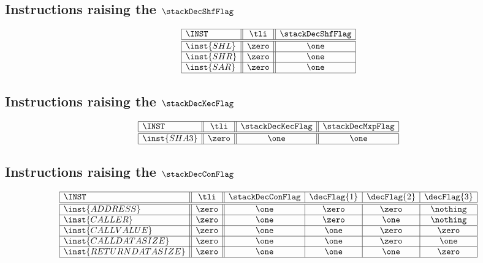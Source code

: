 \subsection{Instructions raising the $\stackDecShfFlag$}
\label{hub: instruction handling: Shf}

\[
\begin{array}{|l||c||c|}
	\hline
	\INST		& \tli	& \stackDecShfFlag	\\ \hline\hline
	\inst{SHL}	& \zero	& \one			\\ \hline
	\inst{SHR}	& \zero	& \one			\\ \hline
	\inst{SAR}	& \zero	& \one			\\ \hline
\end{array}
\]

\subsection{Instructions raising the $\stackDecKecFlag$}
\label{hub: instruction handling: Kec}

\[
\begin{array}{|l||c||c||c|}
	\hline
	\INST		& \tli	& \stackDecKecFlag	& \stackDecMxpFlag	\\ \hline\hline
	\inst{SHA3}	& \zero & \one			& \one			\\ \hline
\end{array}
\]

\subsection{Instructions raising the $\stackDecConFlag$}
\label{hub: instruction handling: Con}

\[
\begin{array}{|l||c||c|c|c|c|}
	\hline
	\INST					& \tli	& \stackDecConFlag	& \decFlag{1}	& \decFlag{2}	& \decFlag{3}	\\ \hline\hline
	\inst{ADDRESS}			& \zero & \one			& \zero			& \zero			& \nothing		\\ \hline
	\inst{CALLER}			& \zero & \one			& \zero			& \one			& \nothing		\\ \hline
	\inst{CALLVALUE}		& \zero & \one			& \one			& \zero			& \zero			\\ \hline
	\inst{CALLDATASIZE}		& \zero & \one			& \one			& \zero			& \one			\\ \hline
	\inst{RETURNDATASIZE}	& \zero & \one			& \one			& \one			& \zero			\\ \hline
\end{array}
\]

